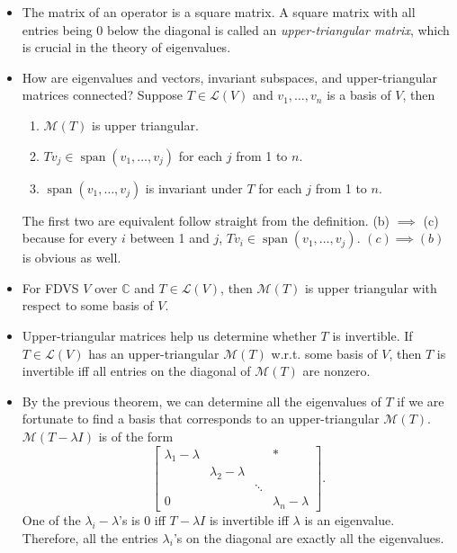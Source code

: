 \documentclass{article}
\newcommand{\C}{\mathbb{C}}
\newcommand{\s}{\operatorname{span}}
\newcommand{\LV}{\mathcal{L}(V)}
\newcommand{\M}{\mathcal{M}}
\begin{document}
\begin{itemize}
    \item The matrix of an operator is a square matrix. A square matrix with all entries being 0 below the diagonal is called an \textit{upper-triangular matrix}, which is crucial in the theory of eigenvalues.
    \item How are eigenvalues and vectors, invariant subspaces, and upper-triangular matrices connected? Suppose $T \in \LV$ and $v_1,\dots,v_n$ is a basis of $V$, then
    \begin{enumerate}[label=(\alph*)]
        \item $\M(T)$ is upper triangular.
        \item $Tv_j \in \s(v_1,\dots,v_j)$ for each $j$ from 1 to $n$.
        \item $\s(v_1,\dots,v_j)$ is invariant under $T$ for each $j$ from 1 to $n$.
    \end{enumerate}
    The first two are equivalent follow straight from the definition. (b) $\implies$ (c) because for every $i$ between 1 and $j$, $Tv_i \in \s(v_1,\dots,v_j)$. $(c) \implies (b)$ is obvious as well.
    \item For FDVS $V$ over $\C$ and $T \in \LV$, then $\M(T)$ is upper triangular with respect to some basis of $V$.
    
    \item Upper-triangular matrices help us determine whether $T$ is invertible. If $T \in \LV$ has an upper-triangular $\M(T)$ w.r.t. some basis of $V$, then $T$ is invertible iff all entries on the diagonal of $\M(T)$ are nonzero.
    
    \item By the previous theorem, we can determine all the eigenvalues of $T$ if we are fortunate to find a basis that corresponds to an upper-triangular $\M(T)$. $\M(T - \lambda I)$ is of the form
    \begin{equation*}
        \begin{bmatrix}
        \lambda_1 - \lambda & & & \ast \\
         & \lambda_2 - \lambda & & \\
         & & \ddots & \\
         0 & & & \lambda_n - \lambda
    \end{bmatrix}.
    \end{equation*}
    One of the $\lambda_i - \lambda$'s is 0 iff $T - \lambda I$ is invertible iff $\lambda$ is an eigenvalue. Therefore, all the entries $\lambda_i$'s on the diagonal are exactly all the eigenvalues.
\end{itemize}
\end{document}
